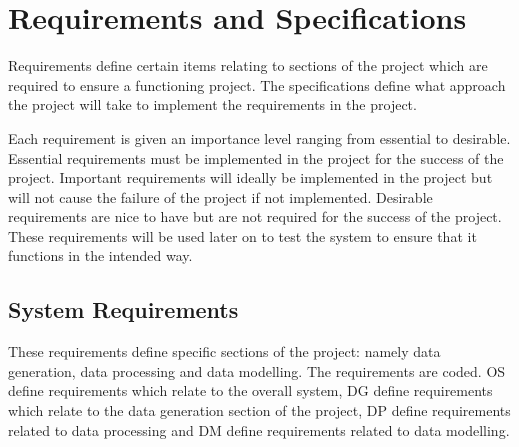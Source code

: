 \chapter{Requirements and Specifications}\label{chp:req}
Requirements define certain items relating to sections of the project which are required to ensure a functioning project. The specifications define what approach the project will take to implement the requirements in the project. 

Each requirement is given an importance level ranging from essential to desirable. Essential requirements must be implemented in the project for the success of the project. Important requirements will ideally be implemented in the project but will not cause the failure of the project if not implemented. Desirable requirements are nice to have but are not required for the success of the project. These requirements will be used later on to test the system to ensure that it functions in the intended way.

\section{System Requirements}
These requirements define specific sections of the project: namely data generation, data processing and data modelling. The requirements are coded. OS define requirements which relate to the overall system, DG define requirements which relate to the data generation section of the project, DP define requirements related to data processing and DM define requirements related to data modelling. 

